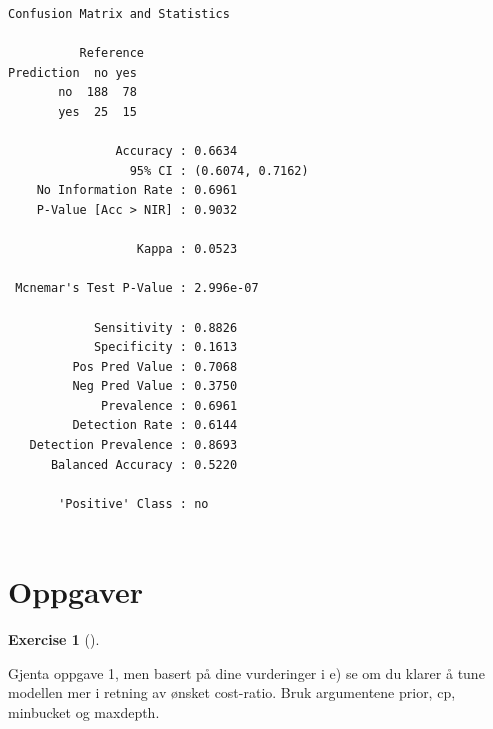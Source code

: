 \documentclass[
  letterpaper,
  DIV=11,
  numbers=noendperiod]{scrreprt}
\theoremstyle{definition}
\newtheorem{exercise}{Exercise}[chapter]
\theoremstyle{remark}
\begin{document}
\begin{verbatim}
Confusion Matrix and Statistics

          Reference
Prediction  no yes
       no  188  78
       yes  25  15
                                          
               Accuracy : 0.6634          
                 95% CI : (0.6074, 0.7162)
    No Information Rate : 0.6961          
    P-Value [Acc > NIR] : 0.9032          
                                          
                  Kappa : 0.0523          
                                          
 Mcnemar's Test P-Value : 2.996e-07       
                                          
            Sensitivity : 0.8826          
            Specificity : 0.1613          
         Pos Pred Value : 0.7068          
         Neg Pred Value : 0.3750          
             Prevalence : 0.6961          
         Detection Rate : 0.6144          
   Detection Prevalence : 0.8693          
      Balanced Accuracy : 0.5220          
                                          
       'Positive' Class : no              
                                          
\end{verbatim}

\hypertarget{oppgaver-3}{%
\section{Oppgaver}\label{oppgaver-3}}

\leavevmode{}%
\begin{exercise}[]\label{exr-}

Gjenta oppgave 1, men basert på dine vurderinger i e) se om du klarer å
tune modellen mer i retning av ønsket cost-ratio. Bruk argumentene
prior, cp, minbucket og maxdepth.

\end{exercise}
\end{document}
